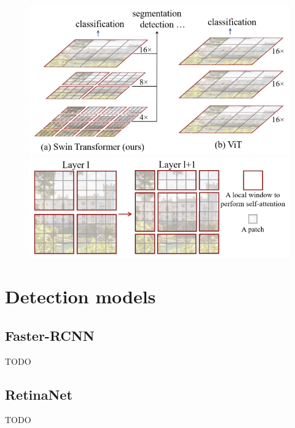 \begin{figure}
    \begin{floatrow}[2]
        {\includegraphics[width=\linewidth]{images/swint_transformer_hierarchy.png}}\qquad
        {\includegraphics[width=\linewidth]{images/swint_transformer_patches.png}}
    \end{floatrow}
\end{figure}

\section{Detection models}
\label{sec:deteciton_models}

\subsection{Faster-RCNN}
TODO

\subsection{RetinaNet}
TODO

